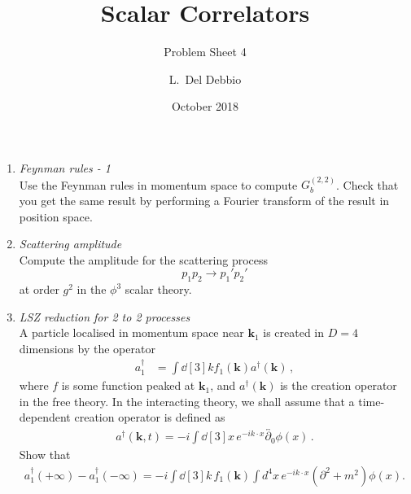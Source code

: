 \documentclass{tutorial}
\subtitle{Problem Sheet 4}
\title{Scalar Correlators}
\author{L.~Del Debbio}
\date{October 2018}
\begin{document}
\maketitle

\begin{enumerate}
  \item \emph{ Feynman rules - 1}\\

    Use the Feynman rules in momentum space to compute
    $G^{(2,2)}_b$. Check that you get the same result by performing a
    Fourier transform of the result in position space.

    \bigskip

  \item \emph{ Scattering amplitude} \\
    
      Compute the amplitude for the scattering process
      \[
        p_1 p_2 \longrightarrow p_1' p_2'
      \]
      at order $g^2$ in the $\phi^3$ scalar theory. 


    \bigskip
    
  \item \emph{ LSZ reduction for 2 to 2 processes}\\
    
    A particle localised in momentum space near $\mathbf{k}_1$ is
    created in $D=4$ dimensions by the operator
    \begin{align}
      \label{eq:1}
      a_1^\dagger &= \int \dd[3]{k}  f_1(\mathbf{k}) a^\dagger(\mathbf{k})\, ,
    \end{align}
    where $f$ is some function peaked at $\mathbf{k}_1$, and
    $a^\dagger(\mathbf{k})$ is the creation operator in the free
    theory. In the interacting theory, we shall assume that a
    time-dependent creation operator is defined as
    \begin{align}
      \label{eq:2}
      a^\dagger(\mathbf{k},t) = -i \int \dd[3]{x}\, e^{-ik\cdot x}
      \overleftrightarrow{\partial_0} \phi(x)\, .
    \end{align}
    Show that
    \begin{align}
      \label{eq:3}
      a_1^\dagger(+\infty) - a_1^\dagger(-\infty) = 
      -i \int \dd[3]{k}\, f_1(\mathbf{k}) \int d^4x\,
      e^{-ik\cdot x} (\partial^2+m^2) \phi(x).
    \end{align}
 

\end{enumerate}
\end{document}
